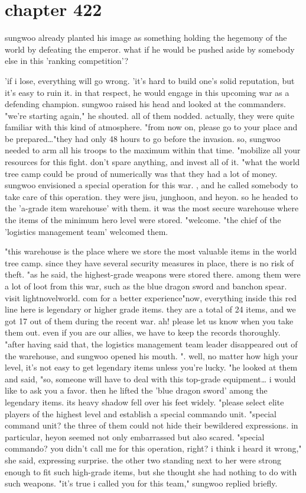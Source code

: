 \section{chapter 422}

sungwoo already planted his image as something holding the hegemony of the world by defeating the emperor.
 what if he would be pushed aside by somebody else in this 'ranking competition'?




'if i lose, everything will go wrong.
'it's hard to build one's solid reputation, but it's easy to ruin it.
in that respect, he would engage in this upcoming war as a defending champion.
sungwoo raised his head and looked at the commanders.
"we're starting again," he shouted.
 all of them nodded.
 actually, they were quite familiar with this kind of atmosphere.
"from now on, please go to your place and be prepared…"they had only 48 hours to go before the invasion.
 so, sungwoo needed to arm all his troops to the maximum within that time.
 "mobilize all your resources for this fight.
 don't spare anything, and invest all of it.
"what the world tree camp could be proud of numerically was that they had a lot of money.
sungwoo envisioned a special operation for this war.
, and he called somebody to take care of this operation.
 they were jisu, junghoon, and heyon.
so he headed to the 'a-grade item warehouse' with them.
 it was the most secure warehouse where the items of the minimum hero level were stored.
"welcome.
"the chief of the 'logistics management team' welcomed them.
 
"this warehouse is the place where we store the most valuable items in the world tree camp.
 since they have several security measures in place, there is no risk of theft.
"as he said, the highest-grade weapons were stored there.
 among them were a lot of loot from this war, such as the blue dragon sword and banchon spear.
visit lightnov­elworld.
com for a better experience"now, everything inside this red line here is legendary or higher grade items.
 they are a total of 24 items, and we got 17 out of them during the recent war.
 ah! please let us know when you take them out.
 even if you are our allies, we have to keep the records thoroughly.
"after having said that, the logistics management team leader disappeared out of the warehouse, and sungwoo opened his mouth.
".
well, no matter how high your level, it's not easy to get legendary items unless you're lucky.
"he looked at them and said, "so, someone will have to deal with this top-grade equipment… i would like to ask you a favor.
then he lifted the 'blue dragon sword' among the legendary items.
 its heavy shadow fell over his feet widely.
 "please select elite players of the highest level and establish a special commando unit.
"special command unit? the three of them could not hide their bewildered expressions.
 in particular, heyon seemed not only embarrassed but also scared.
 "special commando? you didn't call me for this operation, right? i think i heard it wrong," she said, expressing surprise.
 the other two standing next to her were strong enough to fit such high-grade items, but she thought she had nothing to do with such weapons.
"it's true i called you for this team," sungwoo replied briefly.

